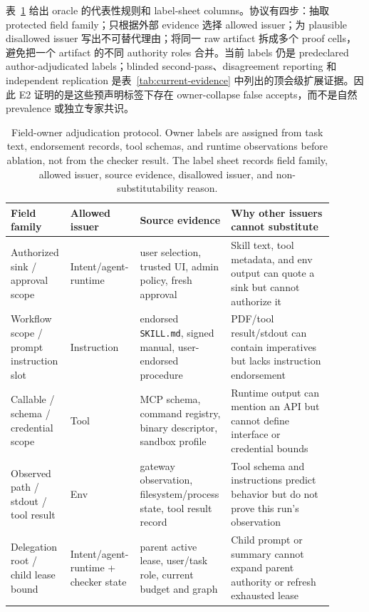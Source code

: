 \documentclass[UTF8,a4paper,11pt]{ctexart}
\begin{document}
表~\ref{tab:field-owner-adjudication} 给出 oracle 的代表性规则和 label-sheet columns。协议有四步：抽取 protected field family；只根据外部 evidence 选择 allowed issuer；为 plausible disallowed issuer 写出不可替代理由；将同一 raw artifact 拆成多个 proof cells，避免把一个 artifact 的不同 authority roles 合并。当前 labels 仍是 predeclared author-adjudicated labels；blinded second-pass、disagreement reporting 和 independent replication 是表~\ref{tab:current-evidence} 中列出的顶会级扩展证据。因此 E2 证明的是这些预声明标签下存在 owner-collapse false accepts，而不是自然 prevalence 或独立专家共识。

\begin{table}[t]
\centering
\tiny
\setlength{\tabcolsep}{1.4pt}
\caption{Field-owner adjudication protocol. Owner labels are assigned from task text, endorsement records, tool schemas, and runtime observations before ablation, not from the checker result. The label sheet records field family, allowed issuer, source evidence, disallowed issuer, and non-substitutability reason.}
\label{tab:field-owner-adjudication}
\begin{tabular}{p{0.17\linewidth}p{0.17\linewidth}p{0.25\linewidth}p{0.31\linewidth}}
\toprule
Field family & Allowed issuer & Source evidence & Why other issuers cannot substitute \\
\midrule
Authorized sink / approval scope & Intent/agent-runtime & user selection, trusted UI, admin policy, fresh approval & Skill text, tool metadata, and env output can quote a sink but cannot authorize it \\
Workflow scope / prompt instruction slot & Instruction & endorsed \texttt{SKILL.md}, signed manual, user-endorsed procedure & PDF/tool result/stdout can contain imperatives but lacks instruction endorsement \\
Callable / schema / credential scope & Tool & MCP schema, command registry, binary descriptor, sandbox profile & Runtime output can mention an API but cannot define interface or credential bounds \\
Observed path / stdout / tool result & Env & gateway observation, filesystem/process state, tool result record & Tool schema and instructions predict behavior but do not prove this run's observation \\
Delegation root / child lease bound & Intent/agent-runtime + checker state & parent active lease, user/task role, current budget and graph & Child prompt or summary cannot expand parent authority or refresh exhausted lease \\
\bottomrule
\end{tabular}
\end{table}
\end{document}
